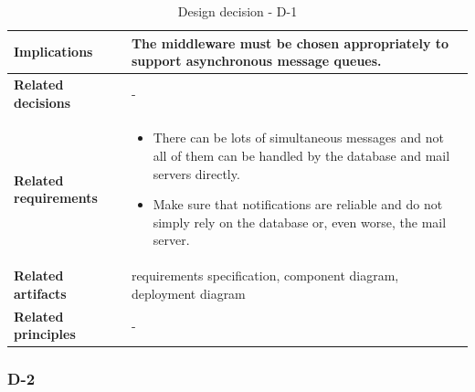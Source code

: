\documentclass[11pt]{article}
\begin{document}
\begin{table}[h]
\begin{tabularx}{\textwidth}{ | l | X |}
	\textbf{Implications} & The middleware must be chosen appropriately to support asynchronous message queues. \\ 
	\hline
	\cellcolor[gray]{0.9}
	\textbf{Related decisions} & - \\ 
	\hline
	\cellcolor[gray]{0.9}
	\textbf{Related requirements} & 
		\begin{itemize}
		\item There can be lots of simultaneous messages and not all of them can be handled by the database and mail servers directly.
		\item Make sure that notifications are reliable and do not simply rely on the database or, even worse, the mail server.
		\end{itemize}\\
	\hline
	\cellcolor[gray]{0.9}
	\textbf{Related artifacts} & requirements specification, component diagram, deployment diagram \\
	\hline
	\cellcolor[gray]{0.9}
	\textbf{Related principles} & -\\
	\hline
	\end{tabularx}
	\caption{Design decision - D-1}
	\label{dec:D1}
\end{table}

\newpage

\subsubsection{D-2}
\end{document}
